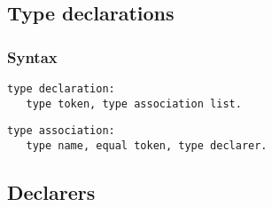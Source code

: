 \documentclass [a4paper,12pt,fleqn]{article}
\begin{document}
\subsection {Type declarations}
\subsubsection*{Syntax}
\begin{letterlist}
\item
\begin{verbatim}
type declaration:
   type token, type association list.
\end{verbatim}
\item
\begin{verbatim}
type association:
   type name, equal token, type declarer.
\end{verbatim}
\end{letterlist}
\subsection {Declarers}
\end{document}
